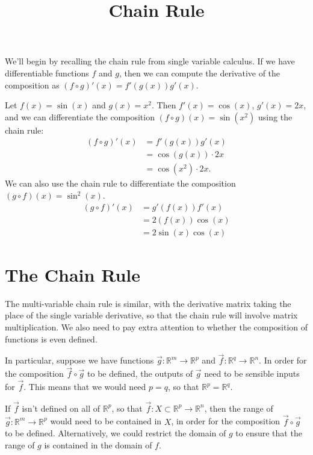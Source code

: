 \documentclass{ximera}
\title{Chain Rule}
\begin{document}
\begin{abstract}
\end{abstract}
\maketitle

We'll begin by recalling the chain rule from single variable calculus. If we have differentiable functions $f$ and $g$, then we can compute the derivative of the composition as $(f\circ g)'(x) =f'(g(x))g'(x)$.

\begin{example}
Let $f(x) = \sin(x)$ and $g(x) = x^2$. Then $f'(x) = \cos(x)$, $g'(x)=2x$, and we can differentiate the composition $(f\circ g)(x) = \sin(x^2)$ using the chain rule:
\begin{align*}
(f\circ g)'(x) &= f'(g(x))g'(x)\\
&=\cos(g(x))\cdot 2x\\
&=\cos(x^2)\cdot 2x.
\end{align*}
We can also use the chain rule to differentiate the composition $(g\circ f)(x) = \sin^2(x)$.
\begin{align*}
(g\circ f)'(x) &= g'(f(x))f'(x)\\
&=2(f(x))\cos(x)\\
&=2\sin(x)\cos(x)
\end{align*}
\end{example}
 
\section*{The Chain Rule} 
 
 The multi-variable chain rule is similar, with the derivative matrix taking the place of the single variable derivative, so that the chain rule will involve matrix multiplication. We also need to pay extra attention to whether the composition of functions is even defined.
 
 In particular, suppose we have functions $\vec{g}:\mathbb{R}^m\rightarrow\mathbb{R}^p$ and $\vec{f}:\mathbb{R}^q\rightarrow\mathbb{R}^n$. In order for the composition $\vec{f}\circ \vec{g}$ to be defined, the outputs of $\vec{g}$ need to be sensible inputs for $\vec{f}$. This means that we would need $p=q$, so that $\mathbb{R}^p = \mathbb{R}^q$.
 
 If $\vec{f}$ isn't defined on all of $\mathbb{R}^p$, so that $\vec{f}:X\subset \mathbb{R}^p\rightarrow\mathbb{R}^n$, then the range of $\vec{g}:\mathbb{R}^m\rightarrow\mathbb{R}^p$ would need to be contained in $X$, in order for the composition $\vec{f}\circ\vec{g}$ to be defined. Alternatively, we could restrict the domain of $g$ to ensure that the range of $g$ is contained in the domain of $f$.
 
\end{document}
